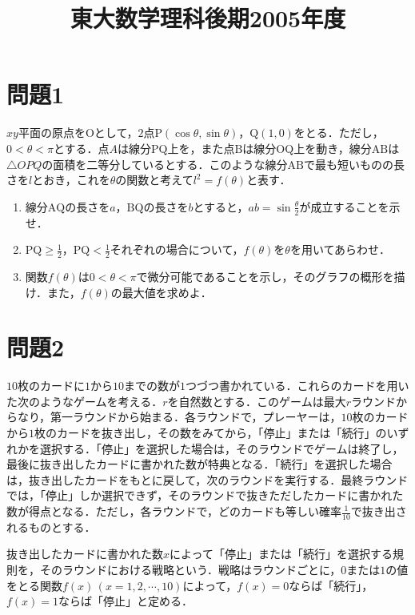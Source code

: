 \documentclass[unicode,12pt, A4j]{ltjsarticle}%
\title{東大数学理科後期2005年度}
\author{}
\date{}
\begin{document}
\maketitle

\section{問題1}
$xy$平面の原点を$\mathrm{O}$として，$2$点$\mathrm{P}(\cos\theta,\sin\theta)$，$\mathrm{Q}(1,0)$をとる．ただし，$0<\theta<\pi$とする．点$A$は線分$\mathrm{PQ}$上を，また点$\mathrm{B}$は線分$\mathrm{OQ}$上を動き，線分$\mathrm{AB}$は$\triangle OPQ$の面積を二等分しているとする．このような線分$\mathrm{AB}$で最も短いものの長さを$l$とおき，これを$\theta$の関数と考えて$l^2=f(\theta)$と表す．
 \begin{enumerate}
  \item 線分$\mathrm{AQ}$の長さを$a$，$\mathrm{BQ}$の長さを$b$とすると，$ab=\sin\frac{\theta}{2}$が成立することを示せ．
  \item $\mathrm{PQ}\ge \frac{1}{2}$，$\mathrm{PQ}<\frac{1}{2}$それぞれの場合について，$f(\theta)$を$\theta$を用いてあらわせ．
  \item 関数$f(\theta)$は$0<\theta<\pi$で微分可能であることを示し，そのグラフの概形を描け．また，$f(\theta)$の最大値を求めよ．
 \end{enumerate}

\section{問題2}
$10$枚のカードに$1$から$10$までの数が$1$つづつ書かれている．これらのカードを用いた次のようなゲームを考える．$r$を自然数とする．このゲームは最大$r$ラウンドからなり，第一ラウンドから始まる．各ラウンドで，プレーヤーは，$10$枚のカードから$1$枚のカードを抜き出し，その数をみてから，「停止」または「続行」のいずれかを選択する．「停止」を選択した場合は，そのラウンドでゲームは終了し，最後に抜き出したカードに書かれた数が特典となる．「続行」を選択した場合は，抜き出したカードをもとに戻して，次のラウンドを実行する．最終ラウンドでは，「停止」しか選択できず，そのラウンドで抜きただしたカードに書かれた数が得点となる．ただし，各ラウンドで，どのカードも等しい確率$\frac{1}{10}$で抜き出されるものとする．

抜き出したカードに書かれた数$x$によって「停止」または「続行」を選択する規則を，そのラウンドにおける戦略という．戦略はラウンドごとに，$0$または$1$の値をとる関数$f(x)\,(x=1,2,\cdots,10)$によって，$f(x)=0$ならば「続行」，$f(x)=1$ならば「停止」と定める．
\end{document}
